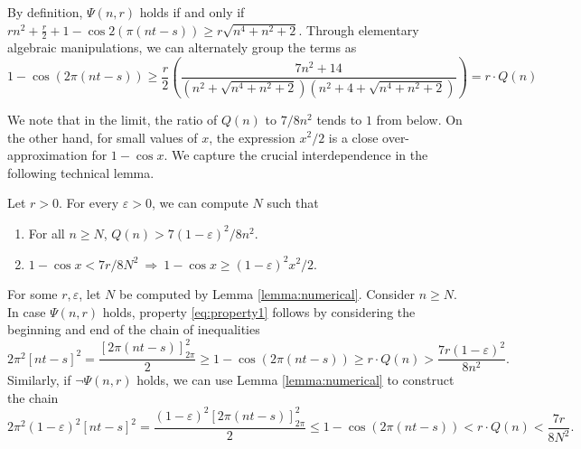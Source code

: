 By definition, $\Psi(n, r)$ holds if and only if $rn^2 + \frac{r}{2} + 1 - \cos 2(\pi(nt-s)) \ge r\sqrt{n^4 + n^2 + 2} $. Through elementary algebraic manipulations, we can alternately group the terms as
\begin{equation}
\label{eq:pivotal}
1 - \cos (2\pi (nt-s)) \ge \frac{r}{2}\left(\frac{7n^2 + 14}{(n^2 + \sqrt{n^4 + n^2 + 2})(n^2 +4+  \sqrt{n^4 + n^2 + 2})}\right) = r\cdot Q(n)
\end{equation}

We note that in the limit, the ratio of $Q(n)$ to $7/8n^2$ tends to $1$ from below. On the other hand, for small values of $x$, the expression $x^2/2$ is a close over-approximation for $1 -\cos x$. We capture the crucial interdependence in the following technical lemma.

\begin{lemma}
\label{lemma:numerical}
Let $r > 0$. For every $\varepsilon > 0$, we can compute $N$ such that
\begin{enumerate}
\item For all $n\ge N$, $Q(n) > {7(1-\varepsilon)^2}/{8n^2}$.
\item $1 - \cos x < 7r/{8N^2}  ~\Rightarrow~ 1- \cos x \ge (1 - \varepsilon)^2x^2/2$.
\end{enumerate}
\end{lemma}

For some $r, \varepsilon$, let $N$ be computed by Lemma \ref{lemma:numerical}. Consider $n \ge N$. In case $\Psi(n, r)$ holds, property \ref{eq:property1} follows by considering the beginning and end of the chain of inequalities
\begin{equation}
{2\pi^2[nt-s]^2} = \frac{[2\pi(nt-s)]^2_{2\pi}}{2} \ge 1 - \cos(2\pi(nt-s)) \ge r\cdot Q(n) > \frac{7r(1-\varepsilon)^2}{8n^2}.
\end{equation}
Similarly, if $\neg\Psi(n, r)$ holds, we can use Lemma \ref{lemma:numerical} to construct the chain
\begin{equation}
2\pi^2(1-\varepsilon)^2 [nt-s]^2= \frac{(1-\varepsilon)^2 [2\pi(nt-s)]_{2\pi}^2}{2} \le 1 - \cos(2\pi(nt-s)) < r\cdot Q(n) < \frac{7r}{8N^2}.
\end{equation}

